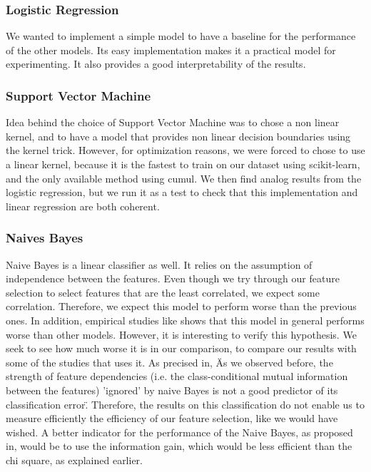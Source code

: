 \documentclass{article}
\begin{document}
    \subsubsection{Logistic Regression}
    We wanted to implement a simple model to have a baseline for the performance of the other models.
    Its easy implementation makes it a practical model for experimenting.
    It also provides a good interpretability of the results.

    \subsubsection{Support Vector Machine}\label{subsubsec:support-vector-machine}
    Idea behind the choice of Support Vector Machine was to chose a non linear kernel, and to have a model that provides non linear decision boundaries using the kernel trick.
    However, for optimization reasons, we were forced to chose to use a linear kernel, because it is the fastest to train on our dataset using scikit-learn, and the only available method using cumul.
    We then find analog results from the logistic regression, but we run it as a test to check that this implementation and linear regression are both coherent.

    \subsubsection{Naives Bayes}

    Naive Bayes is a linear classifier as well.
    It relies on the assumption of independence between the features.
    Even though we try through our feature selection to select features that are the least correlated, we expect some correlation.
    Therefore, we expect this model to perform worse than the previous ones.
    In addition, empirical studies like\cite{MLmodelsComparison} shows that this model in general performs worse than other models.
    However, it is interesting to verify this hypothesis.
    We seek to see how much worse it is in our comparison, to compare our results with some of the studies that uses it.
    As precised in\cite{NaiveBayesBackground}, \"As we observed before, the strength of feature dependencies (i.e. the class-conditional mutual information between the features) ’ignored’ by naive Bayes is not a good predictor of its classification error\".
    Therefore, the results on this classification do not enable us to measure efficiently the efficiency of our feature selection, like we would have wished.
    A better indicator for the performance of the Naive Bayes, as proposed in\cite{NaiveBayesBackground}, would be to use the information gain, which would be less efficient than the chi square, as explained earlier. %
\end{document}

